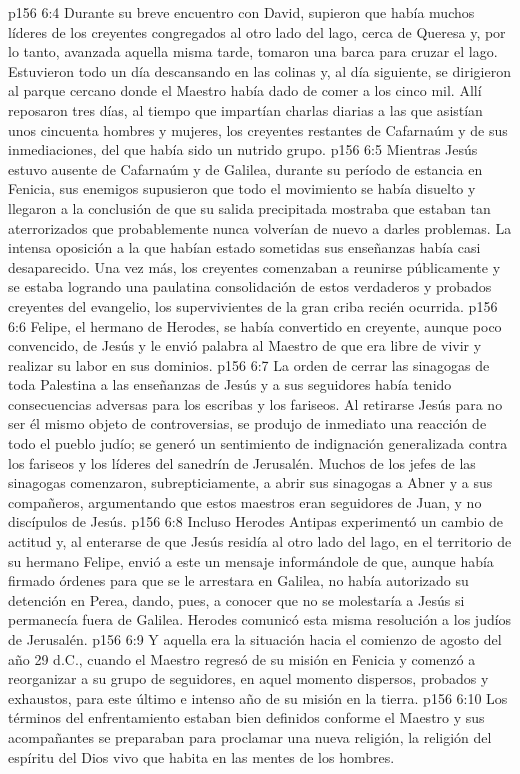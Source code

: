 \vs p156 6:4 Durante su breve encuentro con David, supieron que había muchos líderes de los creyentes congregados al otro lado del lago, cerca de Queresa y, por lo tanto, avanzada aquella misma tarde, tomaron una barca para cruzar el lago. Estuvieron todo un día descansando en las colinas y, al día siguiente, se dirigieron al parque cercano donde el Maestro había dado de comer a los cinco mil. Allí reposaron tres días, al tiempo que impartían charlas diarias a las que asistían unos cincuenta hombres y mujeres, los creyentes restantes de Cafarnaúm y de sus inmediaciones, del que había sido un nutrido grupo.
\vs p156 6:5 \pc Mientras Jesús estuvo ausente de Cafarnaúm y de Galilea, durante su período de estancia en Fenicia, sus enemigos supusieron que todo el movimiento se había disuelto y llegaron a la conclusión de que su salida precipitada mostraba que estaban tan aterrorizados que probablemente nunca volverían de nuevo a darles problemas. La intensa oposición a la que habían estado sometidas sus enseñanzas había casi desaparecido. Una vez más, los creyentes comenzaban a reunirse públicamente y se estaba logrando una paulatina consolidación de estos verdaderos y probados creyentes del evangelio, los supervivientes de la gran criba recién ocurrida.
\vs p156 6:6 Felipe, el hermano de Herodes, se había convertido en creyente, aunque poco convencido, de Jesús y le envió palabra al Maestro de que era libre de vivir y realizar su labor en sus dominios.
\vs p156 6:7 La orden de cerrar las sinagogas de toda Palestina a las enseñanzas de Jesús y a sus seguidores había tenido consecuencias adversas para los escribas y los fariseos. Al retirarse Jesús para no ser él mismo objeto de controversias, se produjo de inmediato una reacción de todo el pueblo judío; se generó un sentimiento de indignación generalizada contra los fariseos y los líderes del sanedrín de Jerusalén. Muchos de los jefes de las sinagogas comenzaron, subrepticiamente, a abrir sus sinagogas a Abner y a sus compañeros, argumentando que estos maestros eran seguidores de Juan, y no discípulos de Jesús.
\vs p156 6:8 Incluso Herodes Antipas experimentó un cambio de actitud y, al enterarse de que Jesús residía al otro lado del lago, en el territorio de su hermano Felipe, envió a este un mensaje informándole de que, aunque había firmado órdenes para que se le arrestara en Galilea, no había autorizado su detención en Perea, dando, pues, a conocer que no se molestaría a Jesús si permanecía fuera de Galilea. Herodes comunicó esta misma resolución a los judíos de Jerusalén.
\vs p156 6:9 Y aquella era la situación hacia el comienzo de agosto del año 29 d.C., cuando el Maestro regresó de su misión en Fenicia y comenzó a reorganizar a su grupo de seguidores, en aquel momento dispersos, probados y exhaustos, para este último e intenso año de su misión en la tierra.
\vs p156 6:10 Los términos del enfrentamiento estaban bien definidos conforme el Maestro y sus acompañantes se preparaban para proclamar una nueva religión, la religión del espíritu del Dios vivo que habita en las mentes de los hombres.
